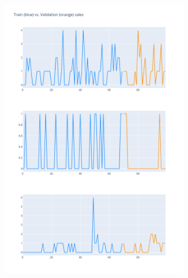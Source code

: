 \documentclass{article}
\begin{document}
\pagebreak
\begin{figure}[hbt!]
	\centering
	\includegraphics[width=\textwidth,height=12cm]{Outputs/25.png}
\end{figure}
\ \\
\end{document}

